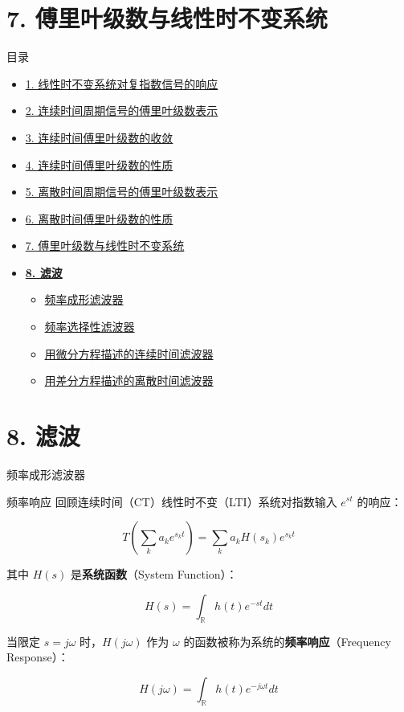 \documentclass[
  ignorenonframetext,
]{beamer}
\providecommand{\tightlist}{%
  \setlength{\itemsep}{0pt}\setlength{\parskip}{0pt}}
\begin{document}
\section{7. 傅里叶级数与线性时不变系统}\label{sec37}

\begin{frame}{目录}
\protect{}\label{toc7}
\begin{itemize}
\tightlist
\item
  \hyperlink{sec31}{1. 线性时不变系统对复指数信号的响应}
\item
  \hyperlink{sec32}{2. 连续时间周期信号的傅里叶级数表示}
\item
  \hyperlink{sec33}{3. 连续时间傅里叶级数的收敛}
\item
  \hyperlink{sec34}{4. 连续时间傅里叶级数的性质}
\item
  \hyperlink{35}{5. 离散时间周期信号的傅里叶级数表示}
\item
  \hyperlink{sec36}{6. 离散时间傅里叶级数的性质}
\item
  \hyperlink{sec37}{7. 傅里叶级数与线性时不变系统}
\item
  \hyperlink{sec38}{\textbf{8. 滤波}}

  \begin{itemize}
  \tightlist
  \item
    \hyperlink{sec381}{频率成形滤波器}
  \item
    \hyperlink{sec382}{频率选择性滤波器}
  \item
    \hyperlink{sec383}{用微分方程描述的连续时间滤波器}
  \item
    \hyperlink{sec383}{用差分方程描述的离散时间滤波器}
  \end{itemize}
\end{itemize}
\end{frame}

\section{8. 滤波}\label{sec38}

\begin{frame}{频率成形滤波器}
\protect{}\label{sec381}
\end{frame}

\begin{frame}{频率响应}
\protect{}\label{ux9891ux7387ux54cdux5e94}
回顾连续时间（CT）线性时不变（LTI）系统对指数输入 \(e^{st}\) 的响应：

\[T \left( \sum_{k} a_k e^{s_k t} \right) = \sum_{k} a_k H(s_k) e^{s_k t}\]

其中 \(H(s)\) 是\textbf{系统函数}（System Function）：

\[H(s) = \int_{\mathbb{R}} h(t) e^{-st} dt\]

当限定 \(s = j\omega\) 时，\(H(j\omega)\) 作为 \(\omega\)
的函数被称为系统的\textbf{频率响应}（Frequency Response）：

\[H(j\omega) = \int_{\mathbb{R}} h(t) e^{-j\omega t} dt\]
\end{frame}
\end{document}

